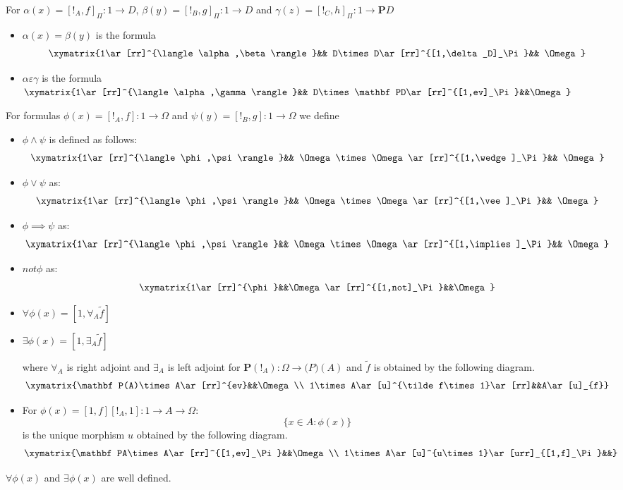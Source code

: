 \documentclass{tac}
\theoremstyle{definition}
\theoremstyle{remark}
\begin{document}
\begin{definition}
	For $\alpha(x)=[!_A,f]_\Pi:1\rightarrow D$, $\beta(y)=[!_B,g]_\Pi:1\rightarrow D$ and $\gamma(z)=[!_C,h]_\Pi:1\rightarrow \mathbf PD$
	\begin{itemize}
		\item
		$\alpha(x)=\beta(y)$ is the formula
		$$\xymatrix{1\ar[rr]^{\langle \alpha,\beta\rangle}&& D\times D\ar[rr]^{[1,\delta_D]_\Pi}&& \Omega}$$
		\item
		$\alpha\varepsilon\gamma$ is the formula
		$\xymatrix{1\ar[rr]^{\langle \alpha,\gamma\rangle}&& D\times \mathbf PD\ar[rr]^{[1,ev]_\Pi}&&\Omega}$
	\end{itemize}
	For formulas $\phi(x)=[!_A,f]:1\rightarrow \Omega$ and $\psi(y)=[!_B,g]:1\rightarrow \Omega$ we define
	\begin{itemize}
		\item $\phi\wedge\psi$ is defined as follows:
		$$\xymatrix{1\ar[rr]^{\langle \phi,\psi\rangle}&& \Omega\times \Omega\ar[rr]^{[1,\wedge]_\Pi}&& \Omega}$$
		\item
		$\phi\vee\psi$ as:
		$$\xymatrix{1\ar[rr]^{\langle \phi,\psi\rangle}&& \Omega\times \Omega\ar[rr]^{[1,\vee]_\Pi }&& \Omega}$$
		\item
		$\phi\implies\psi$ as:
		$$\xymatrix{1\ar[rr]^{\langle \phi,\psi\rangle}&& \Omega\times \Omega\ar[rr]^{[1,\implies]_\Pi }&& \Omega}$$
		\item
		$not\phi$ as:
		$$\xymatrix{1\ar[rr]^{\phi}&&\Omega\ar[rr]^{[1,not]_\Pi}&&\Omega}$$
		\item $\forall\phi(x)=[1,\forall_A\tilde f]$
		\item $\exists\phi(x)=[1,\exists_A\tilde f]$
			
	where $\forall_A$ is right adjoint and $\exists_A$ is left adjoint for $\mathbf{P}(!_A):\Omega\rightarrow \mathbf(P)(A)$ and $\tilde f$ is obtained by the following diagram.
	$$\xymatrix{\mathbf P(A)\times A\ar[rr]^{ev}&&\Omega\\
	1\times A\ar[u]^{\tilde f\times 1}\ar[rr]&&A\ar[u]_{f}}$$
	\item
	For $\phi(x)=[1,f][!_A,1]:1\rightarrow A\rightarrow \Omega$:
	$$\lbrace x\in A: \phi(x)\rbrace$$ is the unique morphism $u$ obtained by the following diagram.
	$$\xymatrix{\mathbf PA\times A\ar[rr]^{[1,ev]_\Pi}&&\Omega\\
	1\times A\ar[u]^{u\times 1}\ar[urr]_{[1,f]_\Pi}&&}$$
	\end{itemize}
\end{definition}
\begin{proposition}
	$\forall\phi(x)$ and $\exists\phi(x)$ are well defined.
\end{proposition}
\end{document}
